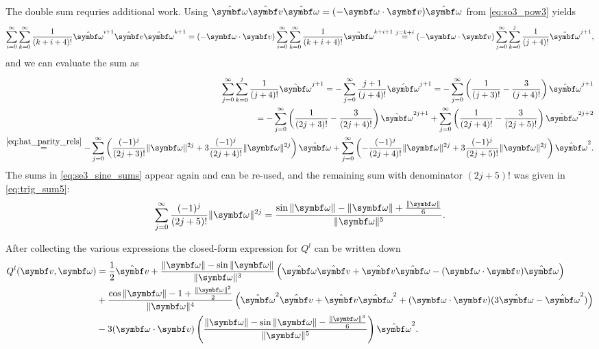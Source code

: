 The double sum requries additional work. Using $\hat \bomega \hat \bv \hat \bomega = (-\bomega \cdot \bv) \hat \bomega$ from \eqref{eq:so3_pow3} yields
\begin{equation*}
  \sum_{i = 0}^\infty \sum_{k = 0}^\infty \frac{1}{(k+i+4)!} \hat \bomega^{i+1} \hat \bv \hat \bomega^{k+1} = (-\bomega \cdot \bv) \sum_{i = 0}^\infty \sum_{k = 0}^\infty \frac{1}{(k+i+4)!} \hat \bomega^{k+i+1}  \overset{j = k+i}=  (-\bomega \cdot \bv) \sum_{j = 0}^\infty \sum_{k = 0}^{j} \frac{1}{(j+4)!} \hat \bomega^{j+1},
\end{equation*}
and we can evaluate the sum as
\begin{equation*}
  \begin{aligned}
    \sum_{j=0}^\infty \sum_{k=0}^j \frac{1}{(j+4)!} \hat \bomega^{j+1} = - \sum_{j = 0}^\infty \frac{j+1}{(j+4)!} \hat \bomega^{j+1} = - \sum_{j=0}^\infty \left(\frac{1}{(j+3)!} - \frac{3}{(j+4)!} \right) \hat \bomega^{j+1} \\
    = - \sum_{j=0}^\infty \left(\frac{1}{(2j+3)!} - \frac{3}{(2j+4)!} \right) \hat \bomega^{2j+1} + \sum_{j=0}^\infty \left(\frac{1}{(2j+4)!} - \frac{3}{(2j+5)!} \right) \hat \bomega^{2j+2}                                   \\
    \overset{\eqref{eq:hat_parity_rels}}=   -\sum_{j=0}^\infty \left(\frac{(-1)^j  }{(2j+3)!}\| \bomega \|^{2j} + 3\frac{(-1)^j }{(2j+4)!} \| \bomega \|^{2j}\right)  \hat \bomega + \sum_{j=0}^\infty \left(-\frac{(-1)^j  }{(2j+4)!} \| \bomega \|^{2j} + 3\frac{(-1)^j  }{(2j+5)!}\| \bomega \|^{2j} \right) \hat \bomega^2 .
  \end{aligned}
\end{equation*}
The sums in \eqref{eq:se3_sine_sums} appear again and can be re-used, and the remaining sum with denominator $(2j+5)!$ was given in \eqref{eq:trig_sum5}:
\begin{equation}
  \sum_{j=0}^\infty \frac{(-1)^j}{(2j+5)!} \| \bomega \|^{2j} = \frac{\sin \|\bomega \| - \| \bomega \| + \frac{\|\bomega\|}{6}}{\| \bomega \|^5}.
\end{equation}
\begin{important}
  After collecting the various expressions the closed-form expression for $Q^l$ can be written down
  \begin{equation}
    \label{eq:se3_q_expr}
    \begin{aligned}
      Q^l (\bv, \bomega) & = \frac{1}{2}\hat \bv + \frac{\| \bomega \| - \sin \| \bomega \|}{\| \bomega \|^3}\left(\hat \bomega \hat \bv + \hat \bv \hat \bomega - (\bomega \cdot \bv) \hat \bomega \right)                     \\
                         & + \frac{ \cos \| \bomega \| - 1 + \frac{\|\bomega\|^2}{2} }{\| \bomega \|^4} \left(\hat \bomega^2 \hat \bv + \hat \bv \hat \bomega^2 + (\bomega \cdot \bv) (3 \hat \bomega - \hat \bomega^2) \right) \\
                         & - 3(\bomega \cdot \bv) \left(  \frac{\|\bomega\| - \sin \|\bomega\| - \frac{\|\bomega\|^3}{6}}{\|\bomega\|^5} \right) \hat \bomega^2 .
    \end{aligned}
  \end{equation}
\end{important}
